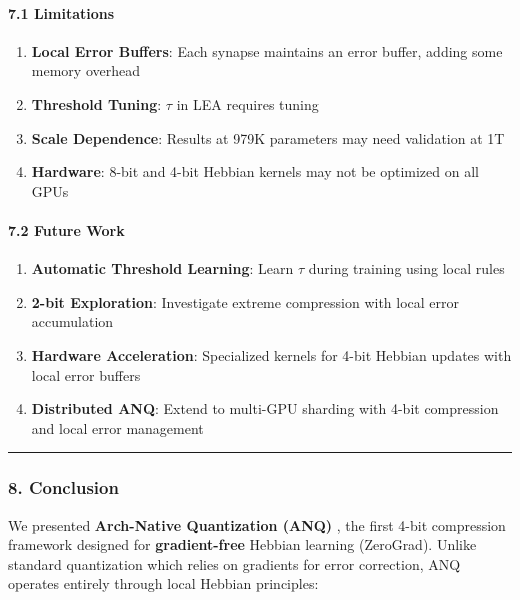 \documentclass[
  11pt,
  a4paper,
]{article}
\providecommand{\tightlist}{%
  \setlength{\itemsep}{0pt}\setlength{\parskip}{0pt}}
\begin{document}
\paragraph{7.1 Limitations}\label{limitations}

\begin{enumerate}
\def\labelenumi{\arabic{enumi}.}
\tightlist
\item
  \textbf{Local Error Buffers}: Each synapse maintains an error buffer,
  adding some memory overhead
\item
  \textbf{Threshold Tuning}: \(\tau\) in LEA requires tuning
\item
  \textbf{Scale Dependence}: Results at 979K parameters may need
  validation at 1T
\item
  \textbf{Hardware}: 8-bit and 4-bit Hebbian kernels may not be
  optimized on all GPUs
\end{enumerate}

\paragraph{7.2 Future Work}\label{future-work}

\begin{enumerate}
\def\labelenumi{\arabic{enumi}.}
\tightlist
\item
  \textbf{Automatic Threshold Learning}: Learn \(\tau\) during training
  using local rules
\item
  \textbf{2-bit Exploration}: Investigate extreme compression with local
  error accumulation
\item
  \textbf{Hardware Acceleration}: Specialized kernels for 4-bit Hebbian
  updates with local error buffers
\item
  \textbf{Distributed ANQ}: Extend to multi-GPU sharding with 4-bit
  compression and local error management
\end{enumerate}

\begin{center}\rule{0.5\linewidth}{0.5pt}\end{center}

\subsubsection{8. Conclusion}\label{conclusion}

We presented \textbf{Arch-Native Quantization (ANQ)} , the first 4-bit
compression framework designed for \textbf{gradient-free} Hebbian
learning (ZeroGrad). Unlike standard quantization which relies on
gradients for error correction, ANQ operates entirely through local
Hebbian principles:
\end{document}
